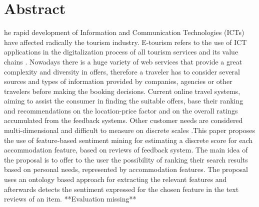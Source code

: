 %
%
%
\chapter{Abstract}
\begin{SingleSpace}
he rapid development of Information and Communication Technologies (ICTs) have affected radically the tourism industry. E-tourism refers to the use of ICT applications in the digitalization process of all tourism services and its value chains \cite{buhalis2003etourism}. Nowadays there is a huge variety of web services that provide a great complexity and diversity in offers, therefore a traveler has to consider several sources and types of information provided by companies, agencies or other travelers before making the booking decisions. Current online travel systems, aiming to assist the consumer in finding the suitable offers, base their ranking and recommendations on the location-price factor and on the overall ratings accumulated from the feedback systems. Other customer needs are considered multi-dimensional and difficult to measure on discrete scales \cite{luo2005information}.This paper proposes the use of feature-based sentiment mining for estimating a discrete score for each accommodation feature, based on reviews of feedback system. The main idea of the proposal is to offer to the user the possibility of ranking their search results based on personal needs, represented by accommodation features. The proposal uses an ontology based approach for extracting the relevant features and afterwards detects the sentiment expressed for the chosen feature in the text reviews of an item. **Evaluation missing**
\end{SingleSpace}
\clearpage